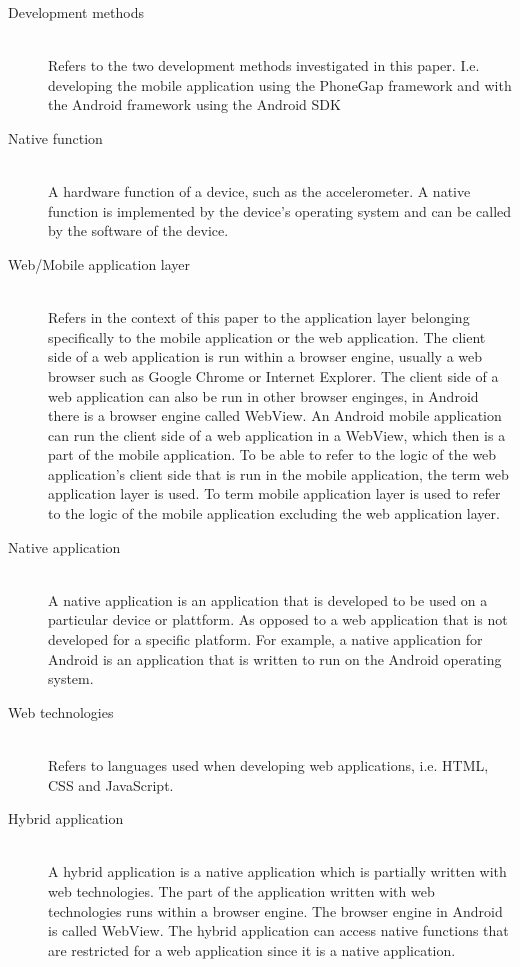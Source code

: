 \begin{description}
  \item[Development methods] \hfill \\
    Refers to the two development methods investigated in this paper. I.e. developing the mobile application using the PhoneGap framework and with the Android framework using the Android SDK
  \item[Native function] \hfill \\
     A hardware function of a device, such as the accelerometer. A native function is implemented by the device's operating system and can be called by the software of the device.     
  \item[Web/Mobile application layer] \hfill \\
	Refers in the context of this paper to the application layer belonging specifically to the mobile application or the web application. The client side of a web application is run within a browser engine, usually a web browser such as Google Chrome or Internet Explorer. The client side of a web application can also be run in other browser enginges, in Android there is a browser engine called WebView. An Android mobile application can run the client side of a web application in a WebView, which then is a part of the mobile application. To be able to refer to the logic of the web application's client side that is run in the mobile application, the term web application layer is used. To term mobile application layer is used to refer to the logic of the mobile application excluding the web application layer.
	\item[Native application] \hfill \\
	A native application is an application that is developed to be used on a particular device or plattform. As opposed to a web application that is not developed for a specific platform. For example, a native application for Android is an application that is written to run on the Android operating system.
\item[Web technologies] \hfill \\
	Refers to languages used when developing web applications, i.e. HTML, CSS and JavaScript.
\item[Hybrid application] \hfill \\
	A hybrid application is a native application which is partially written with web technologies. The part of the application written with web technologies runs within a browser engine. The browser engine in Android is called WebView. The hybrid application can access native functions that are restricted for a web application since it is a native application.

\end{description}
